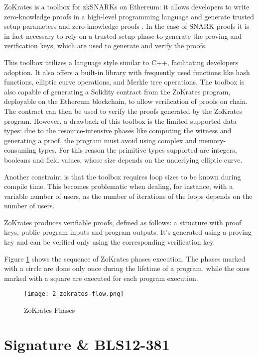 ZoKrates is a toolbox for zkSNARKs on Ethereum: it allows developers to write zero-knowledge proofs in a high-level programming language and generate trusted setup parameters and zero-knowledge proofs \cite{eberhardt_ZoKrates_2018}. In the case of SNARK proofs it is in fact necessary to rely on a trusted setup phase to generate the proving and verification keys, which are used to generate and verify the proofs.

This toolbox utilizes a language style similar to C++, facilitating developers adoption. It also offers a built-in library with frequently used functions like hash functions, elliptic curve operations, and Merkle tree operations. The toolbox is also capable of generating a Solidity contract from the ZoKrates program, deployable on the Ethereum blockchain, to allow verification of proofs on chain. The contract can then be used to verify the proofs generated by the ZoKrates program. However, a drawback of this toolbox is the limited supported data types: due to the resource-intensive phases like computing the witness and generating a proof, the program must avoid using complex and memory-consuming types. For this reason the primitive types supported are integers, booleans and field values, whose size depends on the underlying elliptic curve.

Another constraint is that the toolbox requires loop sizes to be known during compile time. This becomes problematic when dealing, for instance, with a variable number of users, as the number of iterations of the loops depends on the number of users.

ZoKrates produces verifiable proofs, defined as follows: a structure with proof keys, public program inputs and program outputs. It's generated using a proving key and can be verified only using the corresponding verification key.

Figure \ref{fig:2_zokrates-flow} shows the sequence of ZoKrates phases execution. The phases marked with a circle are done only once during the lifetime of a program, while the ones marked with a square are executed for each program execution.

\begin{figure}[htb]
      \centering
      \texttt{[image: 2\_zokrates-flow.png]}
      \caption{ZoKrates Phases \cite{ise_department_tub_material_nodate}}
      \label{fig:2_zokrates-flow}
\end{figure}

\section{Signature \& BLS12-381}

